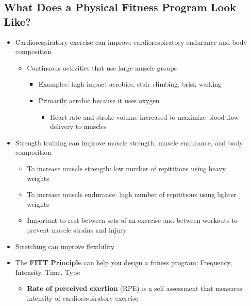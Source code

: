 \documentclass[12pt]{article}
\begin{document}
        \subsection{What Does a Physical Fitness Program Look Like?}
            \begin{itemize}
                \item Cardiorespiratory exercise can improve cardiorespiratory endurance and body composition
                    \begin{itemize}
                        \item Continuous activities that use large muscle groups
                            \begin{itemize}
                                \item Examples: high-impact aerobics, stair climbing, brisk walking
                                \item Primarily aerobic because it uses oxygen
                                    \begin{itemize}
                                        \item Heart rate and stroke volume increased to maximize blood flow delivery to muscles
                                    \end{itemize}
                            \end{itemize}
                    \end{itemize}
                \item Strength training can improve muscle strength, muscle endurance, and body composition
                    \begin{itemize}
                        \item To increase muscle strength: low number of repititions using heavy weights
                        \item To increase muscle endurance: high number of repititions using lighter weights
                        \item Important to rest between sets of an exercise and between workouts to prevent muscle strains and injury
                    \end{itemize}
                \item Stretching can improve flexibility
                \item The \textbf{FITT Principle} can help you design a fitness program: Frequency, Intensity, Time, Type
                    \begin{itemize}
                        \item \textbf{Rate of perceived exertion} (RPE) is a self assessment that measures intensity of cardiorespiratory exercise

\end{itemize}
\end{itemize}
\end{document}
